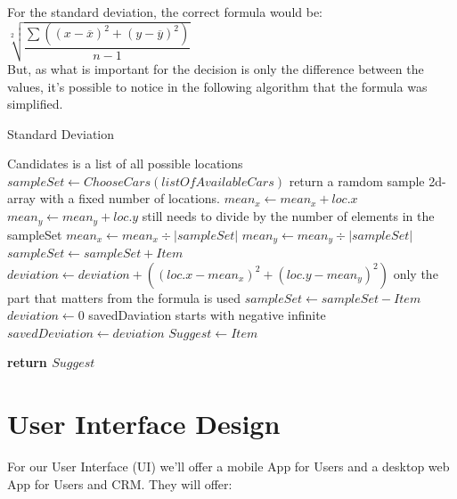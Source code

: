 \documentclass[a4paper]{article}
\begin{document}
For the standard deviation, the correct formula would be: \\
\begin{math}
\sqrt[2]{\dfrac{\sum((x - \overline{x})^2 + (y - \overline{y})^2 )} {n-1}}
\end{math}  \\
But, as what is important for the decision is only the difference between the values, it's possible to notice in the following algorithm that the formula was simplified.


\begin{algorithm}[H]
\caption{Standard Deviation}\label{Std}
\begin{algorithmic}[1]
\Comment Candidates is a list of all possible locations
\State
\State $sampleSet \leftarrow ChooseCars(listOfAvailableCars)$ \Comment return a ramdom sample 2d-array with a fixed  number of locations.
\State
{}
	\State$mean_x \leftarrow mean_x + loc.x$
	\State $mean_y \leftarrow mean_y + loc.y$
\EndFor
\State \Comment still needs to divide by the number of elements in the sampleSet
\State $mean_x \leftarrow mean_x \div |sampleSet|$ 
\State $mean_y \leftarrow mean_y \div |sampleSet|$
\State
{}
	\State $sampleSet \leftarrow sampleSet + Item$
	\State
		\State $deviation \leftarrow deviation + ((loc.x - mean_x)^2  + (loc.y - mean_y)^2)$ \Comment only the part that matters from the formula is used
	\EndFor
	\State
	\State $sampleSet \leftarrow sampleSet - Item$
	\State $deviation \leftarrow 0$
	\State
	\State \Comment savedDaviation starts with negative infinite
		\State $ savedDeviation \leftarrow deviation$
		\State $Suggest \leftarrow Item$
	\EndIf		
\EndFor

\State \textbf{return $Suggest$}
\EndProcedure
\end{algorithmic}
\end{algorithm}



\newpage
\section{User Interface Design}
For our User Interface (UI) we'll offer a mobile App for Users and a desktop web App for Users and CRM. They will offer:
\end{document}
